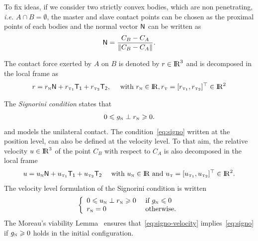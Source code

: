 To fix ideas, if we consider two strictly convex bodies, which are non penetrating, {\it i.e.}  $A \cap B = \emptyset$, the master and slave contact points can be chosen as the proximal points of each bodies and the normal vector  ${\sf N}$ can be written as
\begin{equation}
  \label{eq:normal}
  {\sf N} = \Frac{C_B-C_A}{\|C_B-C_A\|}.
\end{equation}



The contact force exerted by $A$ on $B$ is denoted by $r \in \mathrm{I\!R}^3$ and is decomposed in the local frame as
\begin{equation}
  \label{eq:reaction}
  r = r_{\n} {\sf N} +   r_{\tone}{\sf T_1} + r_{\ttwo}{\sf T_2}  ,\quad \text{ with  } r_{\n} \in \RR, r_{\t}=[r_{\tone},r_{\ttwo}]^\top \in \RR^2
\end{equation}

The \emph{Signorini condition} states that
\begin{equation}
  \label{eq:signo}
  0 \leq g_{\n} \perp r_\n \geq 0.
\end{equation}
 and models the unilateral contact. The condition~\eqref{eq:signo} written at the position level, can also be defined at the velocity level. To that aim, the relative velocity $u \in \mathrm{I\!R}^3$ of the point $C_{B}$ with respect to $C_{A}$ is also decomposed in the local frame
\begin{equation}
  \label{eq:velocity}
  u =  u_\n {\sf N} +  u_{\tone}{\sf T_1} + u_{\ttwo}{\sf T_2}  \quad \text{ with } u_\n \in \RR \text{ and } u_\t=[u_{\tone},u_{\ttwo}]^\top  \in \RR^2.
\end{equation}
The velocity level formulation of the Signorini condition is written 
\begin{equation}
  \label{eq:signo-velocity}
  \left\{\begin{array}{ll}
  0 \leq u_{\n} \perp r_\n \geq 0  &\text{ if } g_{\n} \leq 0 \\
  r_{\n} =0 &\text{ otherwise}.
\end{array}\right.
\end{equation}
The Moreau's viability Lemma~\cite{Moreau1988} ensures that~\eqref{eq:signo-velocity} implies~\eqref{eq:signo} if $g_{{\hbox{\tiny{N}}}}\geqslant 0$ holds in the initial configuration.

